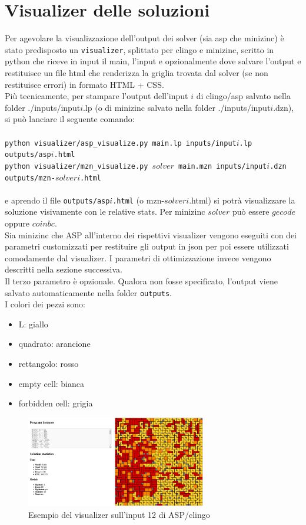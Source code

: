 \documentclass{article}
\begin{document}
\section{Visualizer delle soluzioni}
Per agevolare la visualizzazione dell'output dei solver (sia asp che minizinc) è stato predisposto un \texttt{visualizer}, splittato per clingo e minizinc, scritto in python che riceve in input il main, l'input e opzionalmente dove salvare l'output e restituisce un file html che renderizza la griglia trovata dal solver (se non restituisce errori) in formato HTML + CSS.\\
Più tecnicamente, per stampare l'output dell'input $i$ di clingo/asp salvato nella folder ./inputs/input$i$.lp (o di minizinc salvato nella folder ./inputs/input$i$.dzn), si può lanciare il seguente comando:\\\\
\hspace*{.5cm}\texttt{python visualizer/asp\_visualize.py main.lp inputs/input$i$.lp outputs/asp$i$.html}\\
\hspace*{.5cm}\texttt{python visualizer/mzn\_visualize.py $solver$ main.mzn inputs/input$i$.dzn outputs/mzn-$solver$$i$.html}\\\\
e aprendo il file \texttt{outputs/asp$i$.html} (o mzn-$solver$$i$.html) si potrà visualizzare la soluzione visivamente con le relative stats. Per minizinc $solver$ può essere $gecode$ oppure $coinbc$.\\
Sia minizinc che ASP all'interno dei rispettivi visualizer vengono eseguiti con dei parametri customizzati per restituire gli output in json per poi essere utilizzati comodamente dal visualizer. I parametri di ottimizzazione invece vengono descritti nella sezione successiva.\\
Il terzo parametro è opzionale. Qualora non fosse specificato, l'output viene salvato automaticamente nella folder \texttt{outputs}.\\
I colori dei pezzi sono:
\begin{itemize}
    \item L: giallo
    \item quadrato: arancione
    \item rettangolo: rosso
    \item empty cell: bianca
    \item forbidden cell: grigia
\end{itemize}
\begin{figure}[ht!]
    \centering
    \includegraphics[width=0.7\textwidth]{images/visualizer.png}
    \caption{Esempio del visualizer sull'input 12 di ASP/clingo}
\end{figure}
\end{document}
